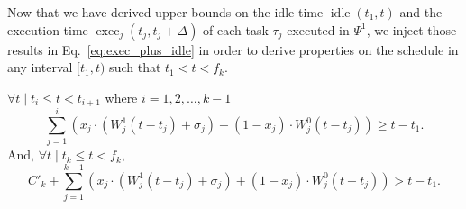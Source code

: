 
Now that we have derived upper bounds on the idle time $\operatorname{idle}(t_1, t)$ and the execution time $\operatorname{exec}_j(t_j, t_j+\Delta)$ of each task $\tau_j$ executed in $\Psi^1$, we inject those results in Eq.~\eqref{eq:exec_plus_idle} in order to derive properties on the schedule in any interval $[t_1, t)$ such that $t_1 < t < f_k$.
\begin{Lemma}
  \label{lemma:conclusion-step2}
$\forall t \mid t_{i} \leq t < t_{i+1}$ where $i=1,2,\ldots,k-1$
{\footnotesize \begin{equation}
\label{eq:exec_plus_idle-2}
\sum_{j=1}^{i} \left( x_j\cdot (W_j^1(t-t_j) +\sigma_j) + (1-x_j)\cdot W_j^0(t-t_j) \right) \geq t-t_1.
\end{equation}}
 And, $\forall t \mid t_k \leq t < f_k$,
{\footnotesize \begin{equation}
\label{eq:exec_plus_idle-3}
C'_k +\sum_{j=1}^{k-1} \left( x_j \cdot (W_j^1(t-t_j) +\sigma_j) + (1-x_j)\cdot W_j^0(t-t_j) \right) > t-t_1.
\end{equation}}
\end{Lemma}
